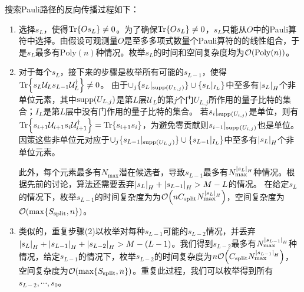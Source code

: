 搜索Pauli路径的反向传播过程如下：
\begin{enumerate}
    \item 选择$s_L$，使得$\Tr{Os_L}\neq 0$。为了确保$\Tr{Os_L}\neq0$，$s_L$只能从$O$中的Pauli算符中选择。由假设可观测量$O$是至多多项式数量个Pauli算符的的线性组合，于是$s_L$最多有$\mathrm{Poly}(n)$种情况。枚举$s_L$的时间和空间复杂度均为$\order{\mathrm{Poly}(n)}$。
    \item 对于每个$s_L$，接下来的步骤是枚举所有可能的$s_{L-1}$，使得$\Tr{s_L \mathcal{U}_L s_{L-1} \mathcal{U}_L^\dagger}\neq 0$。
    由于$\cup_j\{s_L|_{\text{supp}(U_{L,j})}\} \cup \{s_L|_{I_L}\}$中至多有$\abs{s_L}_H$个非单位元素，其中$\text{supp}(U_{L,j})$是第$L$层$\mathcal{U}_L$的第$j$个门$U_{L,j}$所作用的量子比特的集合；${I_L}$是第$L$层中没有门作用的量子比特的集合。
    若$s_i|_{\text{supp}(U_{i,j})}$是单位，则有$\Tr{s_{i+1} \mathcal{U}_{i+1} s_i \mathcal{U}_{i+1}^\dagger}=\Tr{s_{i+1} s_i}$，为避免零贡献则$s_{i-1}|_{\text{supp}(U_{i,j})}$也是单位。
    因策这些非单位元对应于$\cup_j\{s_{L-1}|_{\text{supp}(U_{L,j})}\}\cup \{s_{L-1}|_{I_L}\}$中至多有$\abs{s_L}_H$个非单位元素。

    此外，每个元素最多有$N_\text{max}$潜在候选者，导致$s_{L-1}$最多有$N_{\text{max}}^{\abs{s_L}_H}$种情况。根据先前的讨论，算法还需要丢弃$\abs{s_L}_H+\abs{s_{L-1}}_H> M-L$的情况。
    在给定$s_L$的情况下，枚举$s_{L-1}$的时间复杂度为为$\order{nC_{\text{split}} N_{\text{max}}^{\abs{s_L}_H}}$，空间复杂度为$\order{\max\{S_{\text{split}},n\}}$。

    \item 类似的，重复步骤(2)以枚举对每种$s_{L-1}$可能的$s_{L-2}$情况，并丢弃$\abs{s_L}_H+\abs{s_{L-1}}_H+\abs{s_{L-2}}_H> M-(L-1)$。我们得到$s_{L-2}$最多有$N_{\text{max}}^{\abs{s_{L-1}}_H}$种情况，给定$s_{L-1}$的情况下，枚举$s_{L-2}$的时间复杂度为$n\order{C_{\text{split}} N_{\text{max}}^{\abs{s_{L-1}}_H}}$，空间复杂度为$\order{\max\{S_{\text{split}},n\}}$。重复此过程，我们可以枚举得到所有$s_{L-2},\cdots,s_{0}$。
\end{enumerate}

